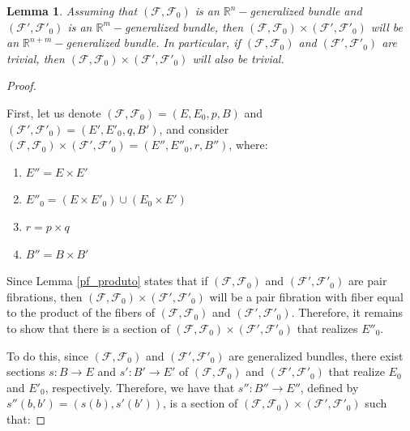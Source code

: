 \documentclass[12pt,oneside]{book}
\newtheorem{lem}    {Lemma}[chapter]
\newcommand{\R}{\mathbb{R}}
\begin{document}
    \begin{lem}\label{fht_produto}
        Assuming that $(\mathcal{F},\mathcal{F}_{0})$ is an $\R^{n}-$generalized bundle and $(\mathcal{F'},\mathcal{F'}_{0})$ is an 
        $\R^{m}-$generalized bundle, then $(\mathcal{F},\mathcal{F}_{0})\times(\mathcal{F'},\mathcal{F'}_{0})$ will be an 
        $\R^{n+m}-$generalized bundle. In particular, if $(\mathcal{F},\mathcal{F}_{0})$ and $(\mathcal{F'},\mathcal{F'}_{0})$ are trivial, 
        then $(\mathcal{F},\mathcal{F}_{0})\times (\mathcal{F'},\mathcal{F'}_{0})$ will also be trivial.
    \end{lem}
    \begin{proof}

        \
        
        First, let us denote $(\mathcal{F},\mathcal{F}_{0})=(E,E_{0},p,B)$ and $(\mathcal{F'},\mathcal{F'}_{0})=(E',E'_{0},q,B')$, and 
        consider $(\mathcal{F},\mathcal{F}_{0})\times(\mathcal{F'},\mathcal{F'}_{0})=(E'',E''_{0},r,B'')$, where:

            \begin{enumerate}
                \item $E''=E\times E'$
                \item $E''_{0}=(E\times E'_{0})\cup (E_{0}\times E')$
                \item $r=p\times q$
                \item $B''=B\times B'$
            \end{enumerate}
        
        Since Lemma \ref{pf_produto} states that if $(\mathcal{F},\mathcal{F}_{0})$ and $(\mathcal{F'},\mathcal{F'}_{0})$ are pair 
        fibrations, then $(\mathcal{F},\mathcal{F}_{0})\times(\mathcal{F'},\mathcal{F'}_{0})$ will be a pair 
        fibration with fiber equal to the product of the fibers of $(\mathcal{F},\mathcal{F}_{0})$ and $(\mathcal{F'},\mathcal{F'}_{0})$. 
        Therefore, it remains to show that there is a section of 
        $(\mathcal{F},\mathcal{F}_{0})\times(\mathcal{F'},\mathcal{F'}_{0})$ that realizes $E''_{0}$.
        
        To do this, since $(\mathcal{F},\mathcal{F}_{0})$ and $(\mathcal{F'},\mathcal{F'}_{0})$ are generalized bundles, there exist 
        sections $s:B\to E$ and $s':B'\to E'$ of $(\mathcal{F},\mathcal{F}_{0})$ and $(\mathcal{F'},\mathcal{F'}_{0})$ that realize 
        $E_{0}$ and $E'_{0}$, respectively. Therefore, we have that $s'':B''\to E''$, defined by $s''(b,b')=(s(b),s'(b'))$, is a section 
        of $(\mathcal{F},\mathcal{F}_{0})\times(\mathcal{F'},\mathcal{F'}_{0})$ such that:
        

\end{proof}
\end{document}

